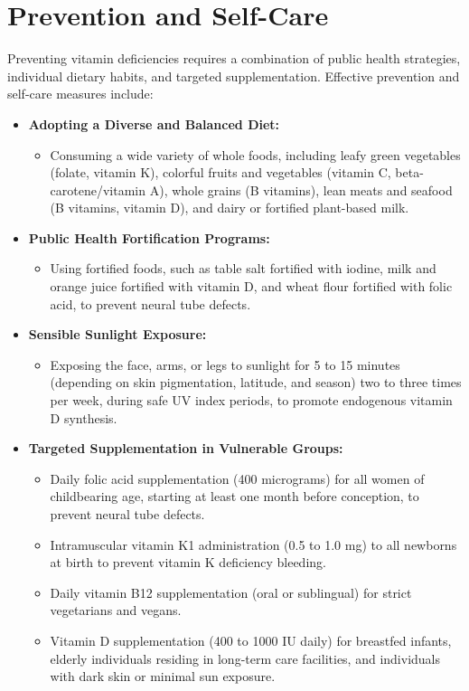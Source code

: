 \section*{Prevention and Self-Care}
Preventing vitamin deficiencies requires a combination of public health strategies, individual dietary habits, and targeted supplementation. Effective prevention and self-care measures include:

\begin{itemize}
    \item \textbf{Adopting a Diverse and Balanced Diet:}
    \begin{itemize}
        \item Consuming a wide variety of whole foods, including leafy green vegetables (folate, vitamin K), colorful fruits and vegetables (vitamin C, beta-carotene/vitamin A), whole grains (B vitamins), lean meats and seafood (B vitamins, vitamin D), and dairy or fortified plant-based milk.
    \end{itemize}

    \item \textbf{Public Health Fortification Programs:}
    \begin{itemize}
        \item Using fortified foods, such as table salt fortified with iodine, milk and orange juice fortified with vitamin D, and wheat flour fortified with folic acid, to prevent neural tube defects.
    \end{itemize}

    \item \textbf{Sensible Sunlight Exposure:}
    \begin{itemize}
        \item Exposing the face, arms, or legs to sunlight for 5 to 15 minutes (depending on skin pigmentation, latitude, and season) two to three times per week, during safe UV index periods, to promote endogenous vitamin D synthesis.
    \end{itemize}

    \item \textbf{Targeted Supplementation in Vulnerable Groups:}
    \begin{itemize}
        \item Daily folic acid supplementation (400 micrograms) for all women of childbearing age, starting at least one month before conception, to prevent neural tube defects.
        \item Intramuscular vitamin K1 administration (0.5 to 1.0 mg) to all newborns at birth to prevent vitamin K deficiency bleeding.
        \item Daily vitamin B12 supplementation (oral or sublingual) for strict vegetarians and vegans.
        \item Vitamin D supplementation (400 to 1000 IU daily) for breastfed infants, elderly individuals residing in long-term care facilities, and individuals with dark skin or minimal sun exposure.
    \end{itemize}


\end{itemize}
